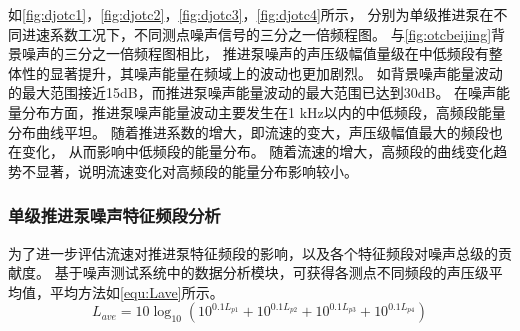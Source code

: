 如\autoref{fig:djotc1}，\autoref{fig:djotc2}，\autoref{fig:djotc3}，\autoref{fig:djotc4}所示，
分别为单级推进泵在不同进速系数工况下，不同测点噪声信号的三分之一倍频程图。
与\autoref{fig:otcbeijing}背景噪声的三分之一倍频程图相比，
推进泵噪声的声压级幅值量级在中低频段有整体性的显著提升，其噪声能量在频域上的波动也更加剧烈。
如背景噪声能量波动的最大范围接近15dB，而推进泵噪声能量波动的最大范围已达到30dB。
在噪声能量分布方面，推进泵噪声能量波动主要发生在1 kHz以内的中低频段，高频段能量分布曲线平坦。
随着推进系数的增大，即流速的变大，声压级幅值最大的频段也在变化，
从而影响中低频段的能量分布。
随着流速的增大，高频段的曲线变化趋势不显著，说明流速变化对高频段的能量分布影响较小。
\begin{comment}
\begin{figure}[htbp]
        \centering
        \subfigure[pic1.]{
        \texttt{[image: 3dj2\_otc.png]}
        }
\end{figure}
\addtocounter{figure}{-1}
\begin{figure}[htbp]
        \centering
        \addtocounter{figure}{1} 
        \subfigure[pic2.]{
        \texttt{[image: 3dj7\_otc.png]}
        }
\end{figure}
\addtocounter{figure}{-1}
\begin{figure}[htbp]
        \centering
        \addtocounter{figure}{1} 
        \vspace{0.02cm}
        \subfigure[pic2.]{
        \texttt{[image: 3dj6\_otc.png]}
        }
\end{figure}
\addtocounter{figure}{-1}
\begin{figure}[htbp]
        \centering
        \addtocounter{figure}{1} 
        \vspace{0.02cm}
        \subfigure[pic2.]{
        \texttt{[image: 3dj3\_otc.png]}
        }
        \caption{\label{fig:dj_modle}不同工况下单级推进泵水下噪声三分之一倍频程图}
\end{figure}
\end{comment}
\subsubsection{单级推进泵噪声特征频段分析}
为了进一步评估流速对推进泵特征频段的影响，以及各个特征频段对噪声总级的贡献度。
基于噪声测试系统中的数据分析模块，可获得各测点不同频段的声压级平均值，平均方法如\autoref{equ:Lave}所示。
\begin{equation}
    \label{equ:Lave}
    L_{ave}=10\log_{10}\left ( {10^{0.1L_{p1}}}+{10^{0.1L_{p2}}}+{10^{0.1L_{p3}}}+{10^{0.1L_{p4}}}  \right ) 
\end{equation}

